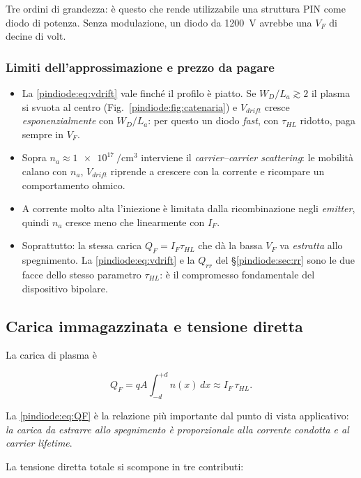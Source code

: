 Tre ordini di grandezza: è questo che rende utilizzabile una struttura PIN come
diodo di potenza. Senza modulazione, un diodo da \SI{1200}{\volt} avrebbe una
$V_F$ di decine di volt.

\subsubsection*{Limiti dell'approssimazione e prezzo da pagare}

\begin{itemize}
\item La \eqref{pindiode:eq:vdrift} vale finché il profilo è piatto. Se
$W_D / L_a \gtrsim 2$ il plasma si svuota al centro (Fig.~\ref{pindiode:fig:catenaria}) e $V_{drift}$
cresce \emph{esponenzialmente} con $W_D/L_a$: per questo un diodo \emph{fast},
con $\tau_{HL}$ ridotto, paga sempre in $V_F$.
\item Sopra $n_a \approx \SI{1e17}{\per\centi\meter\cubed}$ interviene il
\emph{carrier--carrier scattering}: le mobilità calano con $n_a$, $V_{drift}$
riprende a crescere con la corrente e ricompare un comportamento ohmico.
\item A corrente molto alta l'iniezione è limitata dalla ricombinazione negli
\emph{emitter}, quindi $n_a$ cresce meno che linearmente con $I_F$.
\item Soprattutto: la stessa carica $Q_F = I_F \tau_{HL}$ che dà la bassa $V_F$
va \emph{estratta} allo spegnimento. La \eqref{pindiode:eq:vdrift} e la
$Q_{rr}$ del \S\ref{pindiode:sec:rr} sono le due facce dello stesso parametro
$\tau_{HL}$: è il compromesso fondamentale del dispositivo bipolare.
\end{itemize}

\subsection{Carica immagazzinata e tensione diretta}

La carica di plasma è

\begin{equation}
Q_F = q A \int_{-d}^{+d} n(x)\,dx \approx I_F \, \tau_{HL} .
\label{pindiode:eq:QF}
\end{equation}

La \eqref{pindiode:eq:QF} è la relazione più importante dal punto di vista applicativo:
\emph{la carica da estrarre allo spegnimento è proporzionale alla corrente
condotta e al carrier lifetime}.

La tensione diretta totale si scompone in tre contributi:

